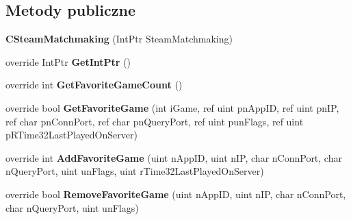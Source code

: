 \subsection*{Metody publiczne}
\begin{DoxyCompactItemize}
\item 
\mbox{\label{class_valve_1_1_steamworks_1_1_c_steam_matchmaking_aea82a7753a0a1334de2af3352c793643}} 
{\bfseries C\+Steam\+Matchmaking} (Int\+Ptr Steam\+Matchmaking)
\item 
\mbox{\label{class_valve_1_1_steamworks_1_1_c_steam_matchmaking_afab5e59db8abb3856457c6e4878c2fdd}} 
override Int\+Ptr {\bfseries Get\+Int\+Ptr} ()
\item 
\mbox{\label{class_valve_1_1_steamworks_1_1_c_steam_matchmaking_ad928375603ad6b97d535e3f95e27c6c3}} 
override int {\bfseries Get\+Favorite\+Game\+Count} ()
\item 
\mbox{\label{class_valve_1_1_steamworks_1_1_c_steam_matchmaking_a5e2d3d8032f2c60e4e956285fb90aa36}} 
override bool {\bfseries Get\+Favorite\+Game} (int i\+Game, ref uint pn\+App\+ID, ref uint pn\+IP, ref char pn\+Conn\+Port, ref char pn\+Query\+Port, ref uint pun\+Flags, ref uint p\+R\+Time32\+Last\+Played\+On\+Server)
\item 
\mbox{\label{class_valve_1_1_steamworks_1_1_c_steam_matchmaking_af53d78402f229f501d1fa06762b92a68}} 
override int {\bfseries Add\+Favorite\+Game} (uint n\+App\+ID, uint n\+IP, char n\+Conn\+Port, char n\+Query\+Port, uint un\+Flags, uint r\+Time32\+Last\+Played\+On\+Server)
\item 
\mbox{\label{class_valve_1_1_steamworks_1_1_c_steam_matchmaking_ad3025c4df9af14701ee4e517ed3a59c2}} 
override bool {\bfseries Remove\+Favorite\+Game} (uint n\+App\+ID, uint n\+IP, char n\+Conn\+Port, char n\+Query\+Port, uint un\+Flags)
\item 
\mbox{\label{class_valve_1_1_steamworks_1_1_c_steam_matchmaking_a7cacc41851214511e6fb55100d1d52c2}} 

\end{DoxyCompactItemize}
